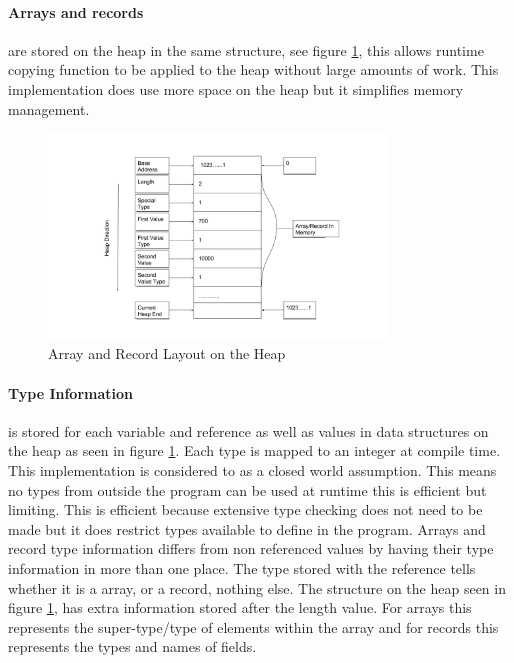 \paragraph{Arrays and records}
 are stored on the heap in the same structure, see figure \ref{fig:arl}, this allows runtime copying function to be applied to the heap without large amounts of work. This implementation does use more space on the heap but it simplifies memory management.
 
\begin{figure}[H]
  \centering
  \includegraphics[width=0.8\textwidth]{ArrayLayout}
  \caption{Array and Record Layout on the Heap}
  \label{fig:arl}
\end{figure}


\paragraph{Type Information}
is stored for each variable and reference as well as values in data structures on the heap as seen in figure \ref{fig:arl}. Each type is mapped to an integer at compile time. This implementation is considered to as a closed world assumption. This means no types from outside the program can be used at runtime this is efficient but limiting. This is efficient because extensive type checking does not need to be made but it does restrict types available to define in the program. Arrays and record type information differs from non referenced values by having their type information in more than one place. The type stored with the reference tells whether it is a array, or a record, nothing else. The structure on the heap seen in figure \ref{fig:arl}, has extra information stored after the length value. For arrays this represents the super-type/type of elements within the array and for records this represents the types and names of fields. 
